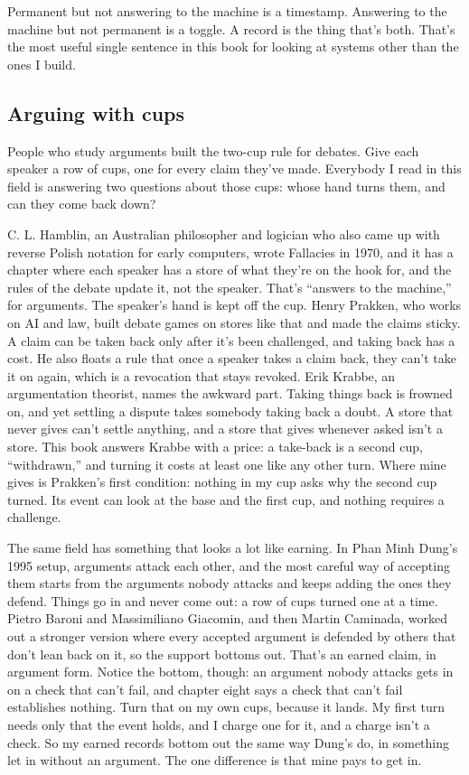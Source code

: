 \documentclass[11pt,twoside]{article}
\theoremstyle{thielethm}
\theoremstyle{thieledef}
\theoremstyle{thieledef}
\theoremstyle{thieledef}
\theoremstyle{thielethm}
\theoremstyle{thieleobs}
\theoremstyle{thielethm}
\begin{document}
Permanent but not answering to the machine is a timestamp. Answering to the machine but not permanent is a toggle. A record is the thing that's both. That's the most useful single sentence in this book for looking at systems other than the ones I build.

\subsection{Arguing with cups}

People who study arguments built the two-cup rule for debates. Give each speaker a row of cups, one for every claim they've made. Everybody I read in this field is answering two questions about those cups: whose hand turns them, and can they come back down?

C. L. Hamblin, an Australian philosopher and logician who also came up with reverse Polish notation for early computers, wrote Fallacies in 1970, and it has a chapter where each speaker has a store of what they're on the hook for, and the rules of the debate update it, not the speaker. That's ``answers to the machine,'' for arguments. The speaker's hand is kept off the cup. Henry Prakken, who works on AI and law, built debate games on stores like that and made the claims sticky. A claim can be taken back only after it's been challenged, and taking back has a cost. He also floats a rule that once a speaker takes a claim back, they can't take it on again, which is a revocation that stays revoked. Erik Krabbe, an argumentation theorist, names the awkward part. Taking things back is frowned on, and yet settling a dispute takes somebody taking back a doubt. A store that never gives can't settle anything, and a store that gives whenever asked isn't a store. This book answers Krabbe with a price: a take-back is a second cup, ``withdrawn,'' and turning it costs at least one like any other turn. Where mine gives is Prakken's first condition: nothing in my cup asks why the second cup turned. Its event can look at the base and the first cup, and nothing requires a challenge.

The same field has something that looks a lot like earning. In Phan Minh Dung's 1995 setup, arguments attack each other, and the most careful way of accepting them starts from the arguments nobody attacks and keeps adding the ones they defend. Things go in and never come out: a row of cups turned one at a time. Pietro Baroni and Massimiliano Giacomin, and then Martin Caminada, worked out a stronger version where every accepted argument is defended by others that don't lean back on it, so the support bottoms out. That's an earned claim, in argument form. Notice the bottom, though: an argument nobody attacks gets in on a check that can't fail, and chapter eight says a check that can't fail establishes nothing. Turn that on my own cups, because it lands. My first turn needs only that the event holds, and I charge one for it, and a charge isn't a check. So my earned records bottom out the same way Dung's do, in something let in without an argument. The one difference is that mine pays to get in.
\end{document}
